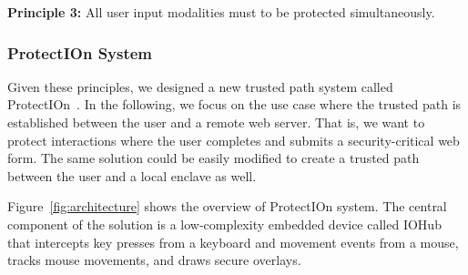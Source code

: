 \documentclass[letterpaper,twocolumn,10pt]{article}
\newcommand{\protection}{\textsf{ProtectIOn}\xspace}
\newcommand{\hub}{\textsf{IOHub}\xspace}
\begin{document}
\begin{tcolorbox}
\textbf{Principle 3:} All user input modalities must to be protected simultaneously.
\end{tcolorbox}


\subsubsection*{\protection System}

Given these principles, we designed a new trusted path system called \protection~\cite{protection}. In the following, we focus on the use case where the trusted path is established between the user and a remote web server. That is, we want to protect interactions where the user completes and submits a security-critical web form. The same solution could be easily modified to create a trusted path between the user and a local enclave as well.

Figure~\ref{fig:architecture} shows the overview of \protection system. The central component of the solution is a low-complexity embedded device called \hub that intercepts key presses from a keyboard and movement events from a mouse, tracks mouse movements, and draws secure overlays. 
\end{document}
